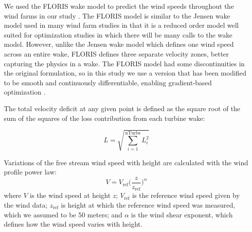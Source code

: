 We used the FLORIS wake model to predict the wind speeds throughout the wind farms in our study \citep{gebraad2016wind}. The FLORIS model is similar to the Jensen wake model used in many wind farm studies \citep{jensen1983note} in that it is a reduced order model well suited for optimization studies in which there will be many calls to the wake model. However, unlike the Jensen wake model which defines one wind speed across an entire wake, FLORIS defines three separate velocity zones, better capturing the physics in a wake. 
The FLORIS model had some discontinuities in the original formulation, so in this study we use a version that has been modified to be smooth and continuously differentiable, enabling gradient-based optimization \citep{thomas2017improving}.


The total velocity deficit at any given point is defined as the square root of the sum of the squares of the loss contribution from each turbine wake:

\begin{equation}
L = \sqrt{\sum_{i=1}^\text{nTurbs}L_i^2}
\end{equation}



\noindent Variations of the free stream wind speed with height are calculated with the wind profile power law: 
\begin{equation}
V = V_{\text{ref}}\Big(\frac{z}{z_{\text{ref}}}\Big)^\alpha
\label{Eq:shear}
\end{equation}
where $V$ is the wind speed at height $z$; $V_{\text{ref}}$ is the reference wind speed given by the wind data; $z_{\text{ref}}$ is height at which the reference wind speed was measured, which we assumed to be 50 meters;  and $\alpha$ is the wind shear exponent, which defines how the wind speed varies with height.